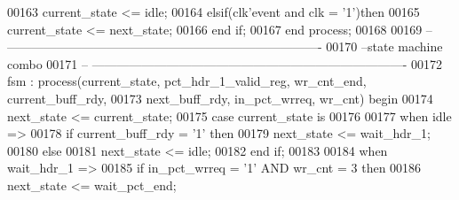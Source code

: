 \begin{DoxyCode}
00163         \textcolor{vhdlchar}{current_state} \textcolor{vhdlchar}{<=} \textcolor{vhdlchar}{idle};
00164     \textcolor{keywordflow}{elsif}\textcolor{vhdlchar}{(}\textcolor{vhdlchar}{clk}\textcolor{vhdlchar}{'}\textcolor{vhdlkeyword}{event} \textcolor{keywordflow}{and} \textcolor{vhdlchar}{clk} \textcolor{vhdlchar}{=} \textcolor{vhdlchar}{'}\textcolor{vhdllogic}{}\textcolor{vhdllogic}{1}\textcolor{vhdlchar}{'}\textcolor{vhdlchar}{)}\textcolor{keywordflow}{then}
00165       \textcolor{vhdlchar}{current_state} \textcolor{vhdlchar}{<=} \textcolor{vhdlchar}{next_state};
00166     \textcolor{keywordflow}{end} \textcolor{keywordflow}{if}; 
00167 \textcolor{keywordflow}{end} \textcolor{keywordflow}{process};
00168 
00169 \textcolor{keyword}{-- ----------------------------------------------------------------------------}
00170 \textcolor{keyword}{--state machine combo}
00171 \textcolor{keyword}{-- ----------------------------------------------------------------------------}
00172 fsm : \textcolor{keywordflow}{process}(current_state, pct_hdr_1_valid_reg, wr_cnt_end, current_buff_rdy, 
00173                next_buff_rdy, in_pct_wrreq, wr_cnt) \textcolor{keywordflow}{begin}
00174     \textcolor{vhdlchar}{next_state} \textcolor{vhdlchar}{<=} \textcolor{vhdlchar}{current_state};
00175     \textcolor{keywordflow}{case} \textcolor{vhdlchar}{current_state} \textcolor{keywordflow}{is}
00176       
00177         \textcolor{keywordflow}{when} \textcolor{vhdlchar}{idle} \textcolor{vhdlchar}{=}\textcolor{vhdlchar}{>}
00178          \textcolor{keywordflow}{if} \textcolor{vhdlchar}{current_buff_rdy} \textcolor{vhdlchar}{=} \textcolor{vhdlchar}{'}\textcolor{vhdllogic}{}\textcolor{vhdllogic}{1}\textcolor{vhdlchar}{'} \textcolor{keywordflow}{then}
00179             \textcolor{vhdlchar}{next_state} \textcolor{vhdlchar}{<=} \textcolor{vhdlchar}{wait\_hdr\_1};
00180          \textcolor{keywordflow}{else} 
00181             \textcolor{vhdlchar}{next_state} \textcolor{vhdlchar}{<=} \textcolor{vhdlchar}{idle};
00182          \textcolor{keywordflow}{end} \textcolor{keywordflow}{if};
00183          
00184       \textcolor{keywordflow}{when} \textcolor{vhdlchar}{wait\_hdr\_1} \textcolor{vhdlchar}{=}\textcolor{vhdlchar}{>} 
00185          \textcolor{keywordflow}{if} \textcolor{vhdlchar}{in_pct_wrreq} \textcolor{vhdlchar}{=} \textcolor{vhdlchar}{'}\textcolor{vhdllogic}{}\textcolor{vhdllogic}{1}\textcolor{vhdlchar}{'} \textcolor{keywordflow}{AND} \textcolor{vhdlchar}{wr_cnt} \textcolor{vhdlchar}{=} \textcolor{vhdllogic}{}\textcolor{vhdllogic}{3} \textcolor{keywordflow}{then} 
00186             \textcolor{vhdlchar}{next_state} \textcolor{vhdlchar}{<=} \textcolor{vhdlchar}{wait\_pct\_end};

\end{DoxyCode}
